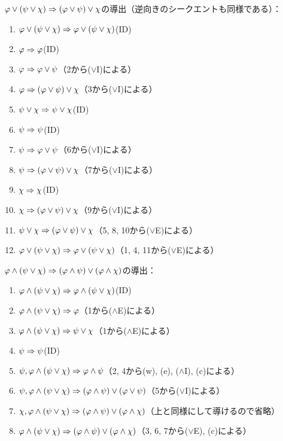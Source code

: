 \(\varphi \lor \paren{\psi \lor \chi} \sequent \paren{\varphi \lor \psi} \lor \chi\)の導出（逆向きのシークエントも同様である）：
\begin{enumerate}
	\item \(\varphi \lor \paren{\psi \lor \chi} \sequent \varphi \lor \paren{\psi \lor \chi}\)\quad (ID)
	\item \(\varphi \Rightarrow \varphi\)\quad (ID)
	\item \(\varphi \Rightarrow \varphi \lor \psi\)\quad （2から(\(\lor\)I)による）
	\item \(\varphi \sequent \paren{\varphi \lor \psi} \lor \chi\)\quad （3から(\(\lor\)I)による）
	\item \(\psi \lor \chi \Rightarrow \psi \lor \chi\)\quad (ID)
	\item \(\psi \Rightarrow \psi\)\quad (ID)
	\item \(\psi \Rightarrow \varphi \lor \psi\)\quad （6から(\(\lor\)I)による）
	\item \(\psi \sequent \paren{\varphi \lor \psi} \lor \chi\)\quad （7から(\(\lor\)I)による）
	\item \(\chi \Rightarrow \chi\)\quad (ID)
	\item \(\chi \sequent \paren{\varphi \lor \psi} \lor \chi\)\quad （9から(\(\lor\)I)による）
	\item \(\psi \lor \chi \sequent \paren{\varphi \lor \psi} \lor \chi\)\quad （5, 8, 10から(\(\lor\)E)による）
	\item \(\varphi \lor \paren{\psi \lor \chi} \sequent \varphi \lor \paren{\psi \lor \chi}\)\quad （1, 4, 11から(\(\lor\)E)による）
\end{enumerate}

\(\varphi \land \paren{\psi \lor \chi} \sequent \paren{\varphi \land \psi} \lor \paren{\varphi \land \chi}\)の導出：
\begin{enumerate}
	\item \(\varphi \land \paren{\psi \lor \chi} \sequent \varphi \land \paren{\psi \lor \chi}\)\quad (ID)
	\item \(\varphi \land \paren{\psi \lor \chi} \sequent \varphi\)\quad （1から(\(\land\)E)による）
	\item \(\varphi \land \paren{\psi \lor \chi} \sequent \psi \lor \chi\)\quad （1から(\(\land\)E)による）
	\item \(\psi \Rightarrow \psi\)\quad (ID)
	\item \(\psi, \varphi \land \paren{\psi \lor \chi} \sequent \varphi \land \psi\)\quad （2, 4から(w), (e), (\(\land\)I), (c)による）
	\item \(\psi, \varphi \land \paren{\psi \lor \chi} \sequent \paren{\varphi \land \psi} \lor \paren{\varphi \lor \psi}\)\quad （5から(\(\lor\)I)による）
	\item \(\chi, \varphi \land \paren{\psi \lor \chi} \sequent \paren{\varphi \land \psi} \lor \paren{\varphi \land \chi}\)\quad （上と同様にして導けるので省略）
	\item \(\varphi \land \paren{\psi \lor \chi} \sequent \paren{\varphi \land \psi} \lor \paren{\varphi \land \chi}\)\quad （3, 6, 7から(\(\lor\)E), (c)による）
\end{enumerate}

